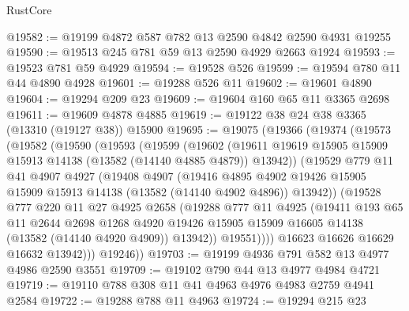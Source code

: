 \begin{lexlean}{RustCore}
\begin{coremodule}
@19582 := @19199 @4872 @587 @782 @13 @2590 @4842 @2590 @4931 @19255
@19590 := @19513 @245 @781 @59 @13 @2590 @4929 @2663 @1924
@19593 := @19523 @781 @59 @4929
@19594 := @19528 @526
@19599 := @19594 @780 @11 @44 @4890 @4928
@19601 := @19288 @526 @11
@19602 := @19601 @4890
@19604 := @19294 @209 @23
@19609 := @19604 @160 @65 @11 @3365 @2698
@19611 := @19609 @4878 @4885
@19619 := @19122 @38 @24 @38 @3365 (@13310 (@19127 @38)) @15900
@19695 := @19075
    (@19366
      (@19374
        (@19573
          (@19582
            (@19590
              (@19593
                (@19599
                  (@19602
                    (@19611
                      @19619
                      @15905
                      @15909
                      @15913
                      @14138
                      (@13582 (@14140 @4885 @4879))
                      @13942))
                  (@19529
                    @779
                    @11
                    @41
                    @4907
                    @4927
                    (@19408
                      @4907
                      (@19416
                        @4895
                        @4902
                        @19426
                        @15905
                        @15909
                        @15913
                        @14138
                        (@13582 (@14140 @4902 @4896))
                        @13942))
                    (@19528
                      @777
                      @220
                      @11
                      @27
                      @4925
                      @2658
                      (@19288
                        @777
                        @11
                        @4925
                        (@19411
                          @193
                          @65
                          @11
                          @2644
                          @2698
                          @1268
                          @4920
                          @19426
                          @15905
                          @15909
                          @16605
                          @14138
                          (@13582 (@14140 @4920 @4909))
                          @13942))
                      @19551))))
              @16623
              @16626
              @16629
              @16632
              @13942)))
        @19246))
@19703 := @19199 @4936 @791 @582 @13 @4977 @4986 @2590 @3551
@19709 := @19102 @790 @44 @13 @4977 @4984 @4721
@19719 := @19110 @788 @308 @11 @41 @4963 @4976 @4983 @2759 @4941 @2584
@19722 := @19288 @788 @11 @4963
@19724 := @19294 @215 @23

\end{coremodule}
\end{lexlean}
